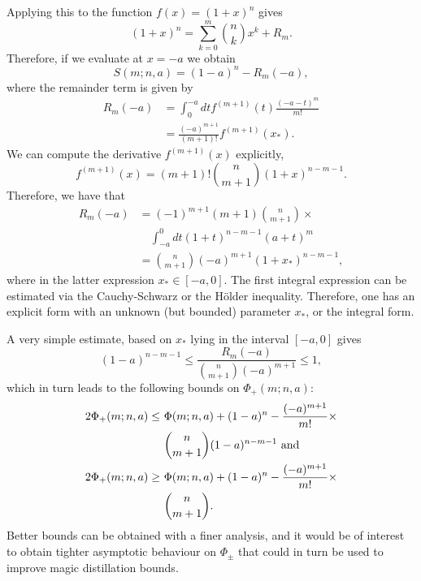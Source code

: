 \documentclass[
twocolumn,
superscriptaddress
]{revtex4-1}
\begin{document}
Applying this to the function $f(x) = (1+x)^n$ gives
\begin{equation}
	(1+x)^n = \sum_{k=0}^m \binom{n}{k} x^k + R_m.
\end{equation}
Therefore, if we evaluate at $x=-a$ we obtain
\begin{equation}
	S(m; n, a) = (1-a)^n - R_m(-a),
\end{equation}
where the remainder term is given by
\begin{align}
	R_m(-a) &= \int_0^{-a} dt f^{(m+1)}(t) \frac{(-a-t)^m}{m!} \\
&= \frac{(-a)^{m+1}}{(m+1)!} f^{(m+1)}(x_*).
\end{align}
We can compute the derivative $f^{(m+1)}(x)$ explicitly,
\begin{equation}
	f^{(m+1)}(x) = (m+1)!\binom{n}{m+1}(1+x)^{n-m-1}.
\end{equation}
Therefore, we have that
\begin{align}
	R_m(-a) &= (-1)^{m+1}(m+1)\binom{n}{m+1}\times \nonumber\\
	&\hspace{12pt} \int_{-a}^0 dt (1+t)^{n-m-1}(a+t)^m \\
&= \binom{n}{m+1}(-a)^{m+1}(1+x_*)^{n-m-1},
\end{align}
where in the latter expression $x_* \in [-a,0]$. 
The first integral expression can be estimated via the Cauchy-Schwarz or the H{\"o}lder inequality. 
Therefore, one has an explicit form with an unknown (but bounded) parameter $x_*$, or the integral form.

A very simple estimate, based on $x_*$ lying in the interval $[-a,0]$ gives
\begin{equation}
(1-a)^{n-m-1} \leq \frac{R_m(-a)}{\binom{n}{m+1}(-a)^{m+1}} \leq 1,
\end{equation}
which in turn leads to the following bounds on $\Phi_+(m; n, a)$:
\begin{align}
	\hspace{-2cm}2\Phi_+(m; n, a) \leq\ &\Phi(m; n, a) + (1-a)^n - \frac{(-a)^{m+1}}{m!} \times \nonumber\\
	 &\binom{n}{m+1} (1-a)^{n-m-1} \text{ and} \\
	2\Phi_+(m; n, a) \geq\ &\Phi(m; n, a) + (1-a)^n - \frac{(-a)^{m+1}}{m!}  \times \nonumber\\
	 &\binom{n}{m+1} .
\end{align}
Better bounds can be obtained with a finer analysis, and it would be of interest to obtain tighter asymptotic behaviour on $\Phi_{\pm}$ that could in turn be used to improve magic distillation bounds.
\end{document}
